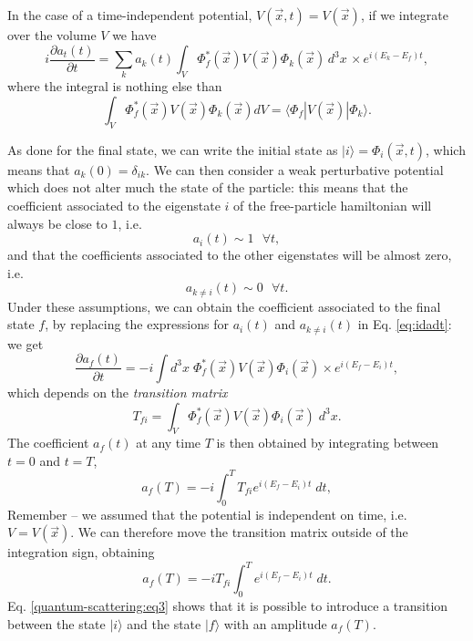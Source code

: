In the case of a time-independent potential, $V(\Vec{x},t) = V(\Vec{x})$, if we integrate over the volume $V$ we have
\begin{equation}\label{eq:idadt}
    i\frac{\partial a_{t}(t)}{\partial t} = \sum_{k} a_k(t) \int_{V} \Phi_{f}^*(\Vec{x})V(\Vec{x})\Phi_{k}(\Vec{x})\,d^3x\,\times e^{i(E_{k}-E_{f})t},
\end{equation}
where the integral is nothing else than
\begin{equation*}
\int_{V}\Phi_{f}^*(\Vec{x})V(\Vec{x})\Phi_{k}(\Vec{x})dV = \langle \Phi_{f}|V(\Vec{x})|\Phi_{k}\rangle.
\end{equation*}

As done for the final state, we can write the initial state as $|i\rangle = \Phi_{i}(\Vec{x},t)$, which means that $a_{k}(0) = \delta_{ik}$. We can then consider a weak perturbative potential which does not alter much the state of the particle: this means that the coefficient associated to the eigenstate $i$ of the free-particle hamiltonian will always be close to $1$, i.e.
\begin{equation*}
    a_{i}(t) \sim 1\,\,\,\, \forall t,
\end{equation*}
and that the coefficients associated to the other eigenstates will be almost zero, i.e.
\begin{equation*}
    a_{k\neq i}(t) \sim 0\,\,\,\, \forall t.
\end{equation*}
Under these assumptions, we can obtain the coefficient associated to the final state $f$, by replacing the expressions for $a_i(t)$ and $a_{k\neq i}(t)$ in Eq. \eqref{eq:idadt}: we get
\begin{equation*}
    \frac{\partial a_{f}(t)}{\partial t} = -i\int d^3x\;\Phi_{f}^*(\Vec{x})V(\Vec{x})\Phi_{i}(\Vec{x}) \times e^{i(E_{f}-E_{i})t},
\end{equation*}
which depends on the \emph{transition matrix}
\begin{equation*}
    T_{fi} = \int_{V}\Phi_{f}^*(\Vec{x})V(\Vec{x})\Phi_{i}(\Vec{x})\;d^3x.
\end{equation*}
The coefficient $a_f(t)$ at any time $T$ is then obtained by integrating between $t=0$ and $t=T$,
\begin{equation*}
    a_{f}(T) = -i\int_{0}^{T}T_{fi}e^{i(E_{f}-E_{i})t}\;dt,
\end{equation*}
Remember -- we assumed that the potential is independent on time, i.e. $V=V(\Vec{x})$. We can therefore move the transition matrix outside of the integration sign, obtaining
\begin{equation}
      a_{f}(T) = -iT_{fi}\int_{0}^{T}e^{i(E_{f}-E_{i})t}\;dt.
      \label{quantum-scattering:eq3}
\end{equation}
Eq. \eqref{quantum-scattering:eq3} shows that it is possible to introduce a transition between the state $|i\rangle$ and the state $|f\rangle$ with an amplitude $a_{f}(T)$.

